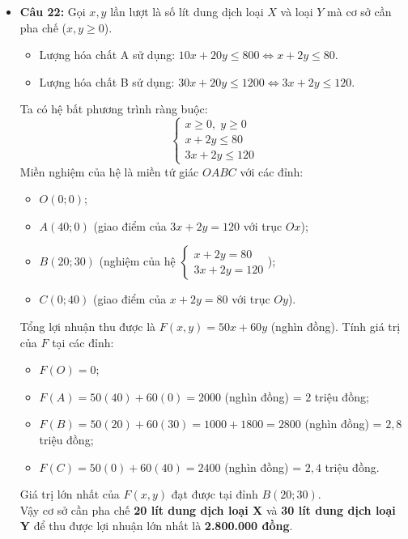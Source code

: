 \documentclass[12pt,a4paper]{article}
\begin{document}
\begin{itemize}[leftmargin=0.6cm, itemsep=4pt]
    \item \textbf{Câu 22:}
    Gọi $x, y$ lần lượt là số lít dung dịch loại $X$ và loại $Y$ mà cơ sở cần pha chế ($x, y \ge 0$).
    \begin{itemize}
        \item Lượng hóa chất A sử dụng: $10x + 20y \le 800 \iff x + 2y \le 80$.
        \item Lượng hóa chất B sử dụng: $30x + 20y \le 1200 \iff 3x + 2y \le 120$.
    \end{itemize}
    Ta có hệ bất phương trình ràng buộc:
    \[
    \begin{cases}
    x \ge 0,\; y \ge 0 \\
    x + 2y \le 80 \\
    3x + 2y \le 120
    \end{cases}
    \]
    Miền nghiệm của hệ là miền tứ giác $OABC$ với các đỉnh:
    \begin{itemize}
        \item $O(0; 0)$;
        \item $A(40; 0)$ (giao điểm của $3x + 2y = 120$ với trục $Ox$);
        \item $B(20; 30)$ (nghiệm của hệ $\begin{cases} x + 2y = 80 \\ 3x + 2y = 120 \end{cases}$);
        \item $C(0; 40)$ (giao điểm của $x + 2y = 80$ với trục $Oy$).
    \end{itemize}
    Tổng lợi nhuận thu được là $F(x, y) = 50x + 60y$ (nghìn đồng). Tính giá trị của $F$ tại các đỉnh:
    \begin{itemize}
        \item $F(O) = 0$;
        \item $F(A) = 50(40) + 60(0) = 2000$ (nghìn đồng) = $2$ triệu đồng;
        \item $F(B) = 50(20) + 60(30) = 1000 + 1800 = 2800$ (nghìn đồng) = $2{,}8$ triệu đồng;
        \item $F(C) = 50(0) + 60(40) = 2400$ (nghìn đồng) = $2{,}4$ triệu đồng.
    \end{itemize}
    Giá trị lớn nhất của $F(x, y)$ đạt được tại đỉnh $B(20; 30)$.\\
    Vậy cơ sở cần pha chế \textbf{20 lít dung dịch loại X} và \textbf{30 lít dung dịch loại Y} để thu được lợi nhuận lớn nhất là \textbf{2.800.000 đồng}.
\end{itemize}
\end{document}
